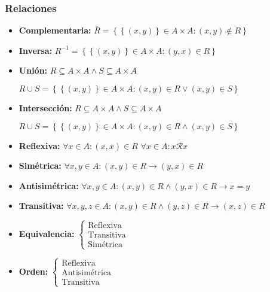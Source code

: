 \documentclass[a4paper, twoside]{article}
\begin{document}
\subsubsection{Relaciones}
\begin{itemize}
	\item \textbf{Complementaria:} $\overline{R} = \left\{ \left\{ (x,y) \right\} \in A \times A: (x,y) \notin R\right\}$

	\item \textbf{Inversa:} $R^{-1} = \left\{ \left\{ (x,y) \right\} \in A \times A: (y,x) \in R\right\}$

	\item \textbf{Unión:} $R \subseteq A \times A \wedge S \subseteq A \times A$
	\begin{center}
		$R \cup S = \left\{ \left\{ (x,y) \right\} \in A \times A: (x,y) \in R \lor (x,y) \in S \right\}$
	\end{center}

	\item \textbf{Intersección:} $R \subseteq A \times A \wedge S \subseteq A \times A$
	\begin{center}
		$R \cup S = \left\{ \left\{ (x,y) \right\} \in A \times A: (x,y) \in R \wedge (x,y) \in S \right\}$
	\end{center}

	\item \textbf{Reflexiva:} $\forall x \in A: (x,x) \in R$
					 $\forall x \in A: x \mathcal{R} x$

	\item \textbf{Simétrica:} $\forall x,y \in A: (x,y) \in R \rightarrow (y,x) \in R$

	\item \textbf{Antisimétrica:} $\forall x,y \in A: (x,y) \in R \wedge (y,x) \in R \rightarrow x = y$

	\item \textbf{Transitiva:} $\forall x,y,z \in A: (x,y) \in R \wedge (y,z) \in R \rightarrow (x,z) \in R$

	\item \textbf{Equivalencia:} $\left\{ \begin{array}{c}
									\text{Reflexiva}\\
									\text{Transitiva}\\
									\text{Simétrica}\end{array}\right.$

	\item \textbf{Orden:} $\left\{ \begin{array}{c}
							\text{Reflexiva}\\
							\text{Antisimétrica}\\
							\text{Transitiva}\end{array}\right.$
\end{itemize}
\end{document}
